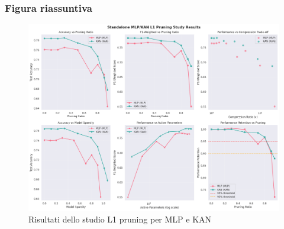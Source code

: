 \documentclass[a4paper,12pt]{report}
\begin{document}
	\subsubsection{Figura riassuntiva}
	\begin{figure}[H]
		\centering
		\includegraphics[width=1.0\textwidth]{img/abl_kanvsmlp_pm.png}
		\caption{Risultati dello studio L1 pruning per MLP e KAN}
	\end{figure}
	
\end{document}
